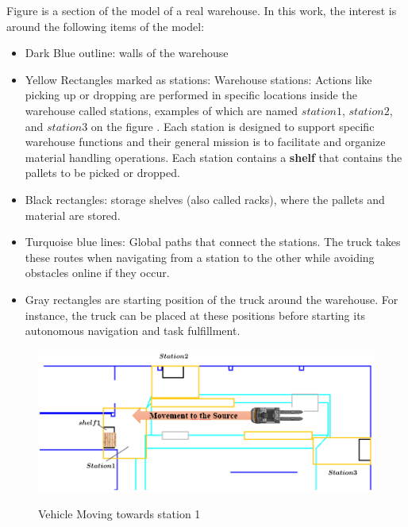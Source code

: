 Figure  is a section of the model of a real warehouse. In this work,
the interest is around the following items of the model:
\begin{itemize}
    \item Dark Blue outline: walls of the warehouse
    \item Yellow Rectangles marked as stations: Warehouse stations: Actions like picking up or 
    dropping are performed in specific locations inside the warehouse called 
    stations, examples of which are named \(station1\), \(station2\), and \(station3\) on the figure .
    Each station is designed to support specific warehouse functions and their general mission
    is to facilitate and organize material handling operations. 
    Each station contains a \textbf{shelf} that contains the pallets to be picked or dropped. 
    \item Black rectangles: storage shelves (also called racks), where the  pallets and material are 
    stored. 
    \item Turquoise blue lines: Global paths that connect the stations.
    The truck takes these routes when navigating from a station to the other while avoiding 
    obstacles online if they occur.
    \item Gray rectangles are starting position of the truck around the warehouse. For instance,
    the truck can be placed at these positions before starting its autonomous navigation and 
    task fulfillment.

\end{itemize}

\begin{figure}[H]
    \begin{center}
       \includegraphics[width=5in]{images/Chap0/move.png}\\
       \caption{Vehicle Moving towards station 1}
       \label{move}
       \end{center}
\end{figure}

